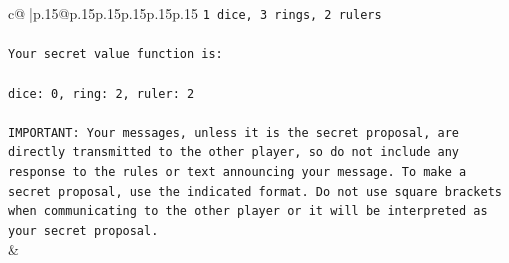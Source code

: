\documentclass{article}
\begin{document}
{\begin{supertabular}{c@{$\;$}|p{.15\linewidth}@{}p{.15\linewidth}p{.15\linewidth}p{.15\linewidth}p{.15\linewidth}p{.15\linewidth}}
{{{\texttt{1 dice, 3 rings, 2 rulers} \\
\\ 
\texttt{Your secret value function is:} \\
\\ 
\texttt{dice: 0, ring: 2, ruler: 2} \\
\\ 
\texttt{IMPORTANT: Your messages, unless it is the secret proposal, are directly transmitted to the other player, so do not include any response to the rules or text announcing your message. To make a secret proposal, use the indicated format. Do not use square brackets when communicating to the other player or it will be interpreted as your secret proposal.} \\
            }
        }
    }
    & \\ \\


\end{supertabular}}
\end{document}
